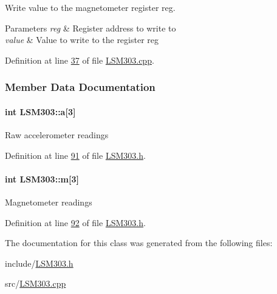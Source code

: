 \-Write value to the magnetometer register reg. 


\begin{DoxyParams}{\-Parameters}
{\em reg} & \-Register address to write to \\
\hline
{\em value} & \-Value to write to the register reg \\
\hline
\end{DoxyParams}


\-Definition at line \hyperlink{_l_s_m303_8cpp_source_l00037}{37} of file \hyperlink{_l_s_m303_8cpp_source}{\-L\-S\-M303.\-cpp}.



\subsubsection{\-Member \-Data \-Documentation}
\hypertarget{class_l_s_m303_ad71c39fa2c1dfd978c9e93b48a6a9310}{
\paragraph[{a}]{\setlength{\rightskip}{0pt plus 5cm}int {\bf \-L\-S\-M303\-::a}\mbox{[}3\mbox{]}}}\label{class_l_s_m303_ad71c39fa2c1dfd978c9e93b48a6a9310}
\-Raw accelerometer readings 

\-Definition at line \hyperlink{_l_s_m303_8h_source_l00091}{91} of file \hyperlink{_l_s_m303_8h_source}{\-L\-S\-M303.\-h}.

\hypertarget{class_l_s_m303_a606cb6a86d385c4c4a9767f6b1bf2ea5}{
\paragraph[{m}]{\setlength{\rightskip}{0pt plus 5cm}int {\bf \-L\-S\-M303\-::m}\mbox{[}3\mbox{]}}}\label{class_l_s_m303_a606cb6a86d385c4c4a9767f6b1bf2ea5}
\-Magnetometer readings 

\-Definition at line \hyperlink{_l_s_m303_8h_source_l00092}{92} of file \hyperlink{_l_s_m303_8h_source}{\-L\-S\-M303.\-h}.



\-The documentation for this class was generated from the following files\-:\begin{DoxyCompactItemize}
\item 
include/\hyperlink{_l_s_m303_8h}{\-L\-S\-M303.\-h}\item 
src/\hyperlink{_l_s_m303_8cpp}{\-L\-S\-M303.\-cpp}\end{DoxyCompactItemize}
